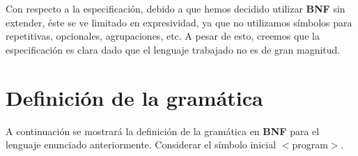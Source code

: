Con respecto a la especificación, debido a que hemos decidido utilizar {\bf BNF} sin extender, éste se ve limitado en expresividad, ya que no utilizamos símbolos para  repetitivas, opcionales, agrupaciones, etc. A pesar de esto, creemos que la especificación es clara dado que el lenguaje trabajado no es de gran magnitud.




\section{Definición de la gramática}
\label{sec:definicion_gramatica}
A continuación se mostrará la definición de la gramática en \textbf{BNF} para el lenguaje enunciado anteriormente. Considerar el símbolo inicial $<$program$>$.



